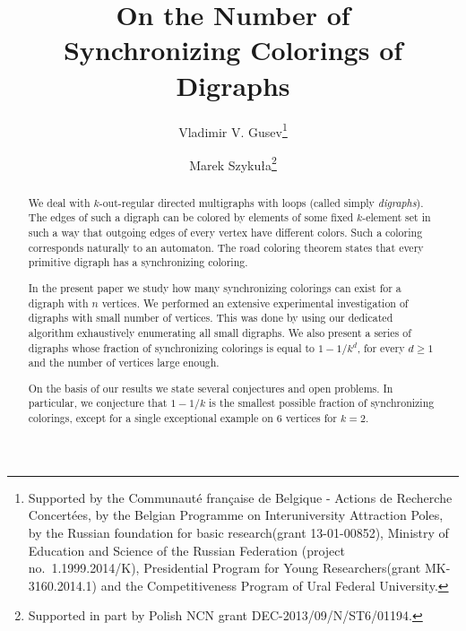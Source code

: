 \documentclass[runningheads]{llncs}
\begin{document}
\title{On the Number of\\Synchronizing Colorings of Digraphs}

\author{Vladimir V. Gusev\thanks{Supported by the Communaut{\'e} fran\c{c}aise de Belgique
- Actions de Recherche Concert{\'e}es, by the Belgian Programme on
Interuniversity Attraction Poles, by the Russian foundation for basic research(grant 13-01-00852), Ministry of Education and Science of the Russian Federation (project no.\ 1.1999.2014/K), Presidential Program for Young Researchers(grant MK-3160.2014.1) and the Competitiveness Program of Ural Federal University.}
\and
Marek Szyku{\l}a\thanks{Supported in part by Polish NCN grant DEC-2013/09/N/ST6/01194.}}




\maketitle

\begin{abstract}
We deal with $k$-out-regular directed multigraphs with loops (called simply \emph{digraphs}).
The edges of such a digraph can be colored by elements of some fixed $k$-element set in such a way that outgoing edges of every vertex have different colors. Such a coloring corresponds naturally to an automaton.
The road coloring theorem states that every primitive digraph has a synchronizing coloring.

In the present paper we study how many synchronizing colorings can exist for a digraph with $n$ vertices.
We performed an extensive experimental investigation of digraphs with small number of vertices. This was done by using our dedicated algorithm exhaustively enumerating all small digraphs.
We also present a series of digraphs whose fraction of synchronizing colorings is equal to $1-1/k^d$, for every $d \ge 1$ and the number of vertices large enough.

On the basis of our results we state several conjectures and open problems. In particular, we conjecture that $1-1/k$ is the smallest possible fraction of synchronizing colorings, except for a single exceptional example on 6 vertices for $k=2$.
\end{abstract}
\end{document}
